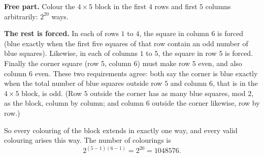 \textbf{Free part.} Colour the $4\times5$ block in the first $4$ rows and first $5$ columns arbitrarily: $2^{20}$ ways.

\textbf{The rest is forced.} In each of rows $1$ to $4$, the square in column $6$ is forced (blue exactly when the first five squares of that row contain an odd number of blue squares). Likewise, in each of columns $1$ to $5$, the square in row $5$ is forced. Finally the corner square (row $5$, column $6$) must make row $5$ even, and also column $6$ even. These two requirements agree: both say the corner is blue exactly when the total number of blue squares outside row $5$ and column $6$, that is in the $4\times5$ block, is odd. (Row $5$ outside the corner has as many blue squares, mod $2$, as the block, column by column; and column $6$ outside the corner likewise, row by row.)

So every colouring of the block extends in exactly one way, and every valid colouring arises this way. The number of colourings is
\[
2^{(5-1)(6-1)}=2^{20}=\boxed{1048576}.
\]
